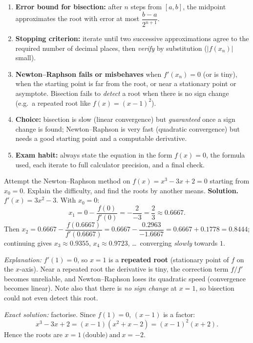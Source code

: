 \documentclass[11pt]{article}
\begin{document}
\begin{methode}
\begin{enumerate}
\item \textbf{Error bound for bisection:} after $n$ steps from $[a,b]$, the midpoint approximates the root with error at most $\dfrac{b-a}{2^{n+1}}$.
\item \textbf{Stopping criterion:} iterate until two successive approximations agree to the required number of decimal places, then \emph{verify} by substitution ($|f(x_n)|$ small).
\item \textbf{Newton--Raphson fails or misbehaves} when $f'(x_n)=0$ (or is tiny), when the starting point is far from the root, or near a stationary point or asymptote. Bisection fails to \emph{detect} a root when there is no sign change (e.g.\ a repeated root like $f(x)=(x-1)^2$).
\item \textbf{Choice:} bisection is slow (linear convergence) but \emph{guaranteed} once a sign change is found; Newton--Raphson is very fast (quadratic convergence) but needs a good starting point and a computable derivative.
\item \textbf{Exam habit:} always state the equation in the form $f(x)=0$, the formula used, each iterate to full calculator precision, and a final check.
\end{enumerate}
\end{methode}

\begin{exoresolu}
Attempt the Newton--Raphson method on $f(x)=x^{3}-3x+2=0$ starting from $x_0=0$. Explain the difficulty, and find the roots by another means.
\tcblower
\textbf{Solution.} $f'(x)=3x^{2}-3$. With $x_0=0$:
\[ x_1=0-\frac{f(0)}{f'(0)}=-\frac{2}{-3}=\frac{2}{3}\approx 0.6667. \]
Then $x_2=0.6667-\dfrac{f(0.6667)}{f'(0.6667)}=0.6667-\dfrac{0.2963}{-1.6667}=0.6667+0.1778=0.8444$; continuing gives $x_3\approx 0.9355$, $x_4\approx 0.9723$, \dots\ converging \emph{slowly} towards $1$.

\emph{Explanation:} $f'(1)=0$, so $x=1$ is a \textbf{repeated root} (stationary point of $f$ on the $x$-axis). Near a repeated root the derivative is tiny, the correction term $f/f'$ becomes unreliable, and Newton--Raphson loses its quadratic speed (convergence becomes linear). Note also that there is \emph{no sign change} at $x=1$, so bisection could not even detect this root.

\emph{Exact solution:} factorise. Since $f(1)=0$, $(x-1)$ is a factor:
\[ x^{3}-3x+2=(x-1)(x^{2}+x-2)=(x-1)^{2}(x+2). \]
Hence the roots are $\boxed{x=1\ \text{(double)}\ \text{and}\ x=-2}$.
\end{exoresolu}
\end{document}
